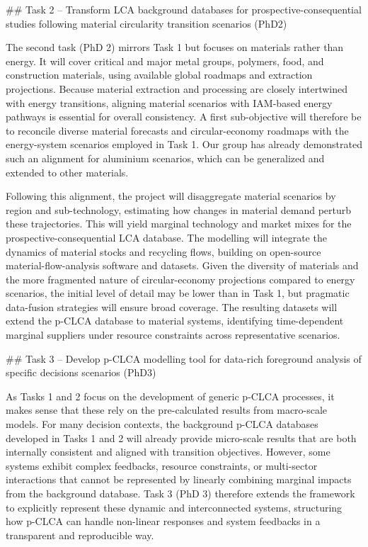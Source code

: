 \documentclass[compact]{nserc} %
\begin{document}
\begin{markdown}
## Task 2 -- Transform LCA background databases for prospective-consequential studies following material circularity transition scenarios (PhD2)

The second task (PhD 2) mirrors Task 1 but focuses on materials rather than energy. It will cover critical and major metal groups, polymers, food, and construction materials, using available global roadmaps and extraction projections. Because material extraction and processing are closely intertwined with energy transitions, aligning material scenarios with IAM-based energy pathways is essential for overall consistency. A first sub-objective will therefore be to reconcile diverse material forecasts and circular-economy roadmaps with the energy-system scenarios employed in Task 1. Our group has already demonstrated such an alignment for aluminium scenarios, which can be generalized and extended to other materials.

Following this alignment, the project will disaggregate material scenarios by region and sub-technology, estimating how changes in material demand perturb these trajectories. This will yield marginal technology and market mixes for the prospective-consequential LCA database. The modelling will integrate the dynamics of material stocks and recycling flows, building on open-source material-flow-analysis software and datasets. Given the diversity of materials and the more fragmented nature of circular-economy projections compared to energy scenarios, the initial level of detail may be lower than in Task 1, but pragmatic data-fusion strategies will ensure broad coverage. The resulting datasets will extend the p-CLCA database to material systems, identifying time-dependent marginal suppliers under resource constraints across representative scenarios.



## Task 3 -- Develop p-CLCA modelling tool for data-rich foreground analysis of specific decisions scenarios (PhD3)

As Tasks 1 and 2 focus on the development of generic p-CLCA processes, it makes sense that these rely on the pre-calculated results from macro-scale models. For many decision contexts, the background p-CLCA databases developed in Tasks 1 and 2 will already provide micro-scale results that are both internally consistent and aligned with transition objectives. However, some systems exhibit complex feedbacks, resource constraints, or multi-sector interactions that cannot be represented by linearly combining marginal impacts from the background database. Task 3 (PhD 3) therefore extends the framework to explicitly represent these dynamic and interconnected systems, structuring how p-CLCA can handle non-linear responses and system feedbacks in a transparent and reproducible way.


\end{markdown}
\end{document}
